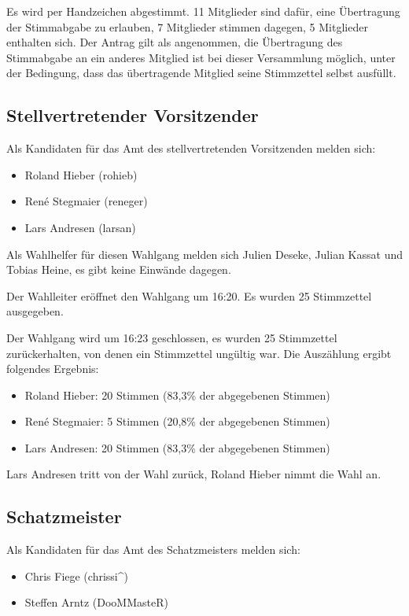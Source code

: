 \documentclass[a4paper,12pt]{scrartcl}
\begin{document}
Es wird per Handzeichen abgestimmt. 11 Mitglieder sind dafür, eine Übertragung
der Stimmabgabe zu erlauben, 7 Mitglieder stimmen dagegen, 5 Mitglieder
enthalten sich. Der Antrag gilt als angenommen, die Übertragung des Stimmabgabe
an ein anderes Mitglied ist bei dieser Versammlung möglich, unter der Bedingung,
dass das übertragende Mitglied seine Stimmzettel selbst ausfüllt.

\subsection{Stellvertretender Vorsitzender}
Als Kandidaten für das Amt des stellvertretenden Vorsitzenden melden sich:
\begin{itemize}
  \item Roland Hieber (rohieb)
  \item René Stegmaier (reneger)
  \item Lars Andresen (larsan)
\end{itemize}

Als Wahlhelfer für diesen Wahlgang melden sich Julien Deseke, Julian Kassat und
Tobias Heine, es gibt keine Einwände dagegen.

Der Wahlleiter eröffnet den Wahlgang um 16:20. Es wurden 25 Stimmzettel
ausgegeben.

Der Wahlgang wird um 16:23 geschlossen, es wurden 25 Stimmzettel zurückerhalten,
von denen ein Stimmzettel ungültig war. Die Auszählung ergibt folgendes
Ergebnis:

\begin{itemize}
  \item Roland Hieber: 20 Stimmen (83{,}3\% der abgegebenen Stimmen)
  \item René Stegmaier: 5 Stimmen (20{,}8\% der abgegebenen Stimmen)
  \item Lars Andresen: 20 Stimmen (83{,}3\% der abgegebenen Stimmen)
\end{itemize}

Lars Andresen tritt von der Wahl zurück, Roland Hieber nimmt die Wahl an.

\subsection{Schatzmeister}
Als Kandidaten für das Amt des Schatzmeisters melden sich:
\begin{itemize}
  \item Chris Fiege (chrissi\textasciicircum)
  \item Steffen Arntz (DooMMasteR)
\end{itemize}
\end{document}
